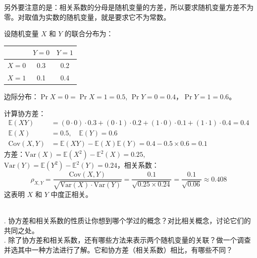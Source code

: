\documentclass[12pt,UTF8]{ctexbook}
\begin{document}
另外要注意的是：相关系数的分母是随机变量的方差，所以要求随机变量方差不为零。对取值为实数的随机变量，就是要求它不为常数。

\begin{ex}
    设随机变量 \(X\) 和 \(Y\) 的联合分布为：
    \begin{center}
        \begin{tabular}{c|cc}
            & \(Y=0\) & \(Y=1\) \\ \hline
            \(X=0\) & 0.3 & 0.2 \\
            \(X=1\) & 0.1 & 0.4
        \end{tabular}
    \end{center}
    边际分布：\(\Pr{X=0}=\Pr{X=1}=0.5\), \(\Pr{Y=0}=0.4\)，\(\Pr{Y=1}=0.6\)。

    计算协方差：
    \begin{align*}
        \mathbb{E}(XY) &= (0\cdot0)\cdot0.3 + (0\cdot1)\cdot0.2 + (1\cdot0)\cdot0.1 + (1\cdot1)\cdot0.4 = 0.4 \\
        \mathbb{E}(X) &= 0.5,\quad \mathbb{E}(Y) = 0.6 \\
        \text{Cov}(X,Y) &= \mathbb{E}(XY) - \mathbb{E}(X)\mathbb{E}(Y) = 0.4 - 0.5 \times 0.6 = 0.1
    \end{align*}
    方差：\(\text{Var}(X) = \mathbb{E}(X^2) - \mathbb{E}^2(X)= 0.25\), \(\text{Var}(Y) = \mathbb{E}(Y^2) - \mathbb{E}^2(Y) = 0.24\)，相关系数：
    $$ \rho_{X,Y} = \frac{\text{Cov}(X,Y)}{\sqrt{\text{Var}(X)\cdot\text{Var}(Y)}} = \frac{0.1}{\sqrt{0.25 \times 0.24}} = \frac{0.1}{\sqrt{0.06}} \approx 0.408 $$
    这表明 \(X\) 和 \(Y\) 中度正相关。
\end{ex}

\begin{sk}
    \mbox{} \\
    . 协方差和相关系数的性质让你想到哪个学过的概念？对比相关概念，讨论它们的共同之处。\\
    . 除了协方差和相关系数，还有哪些方法来表示两个随机变量的关联？做一个调查并选其中一种方法进行了解。它和协方差（相关系数）相比，有哪些不同？
\end{sk}
\end{document}
